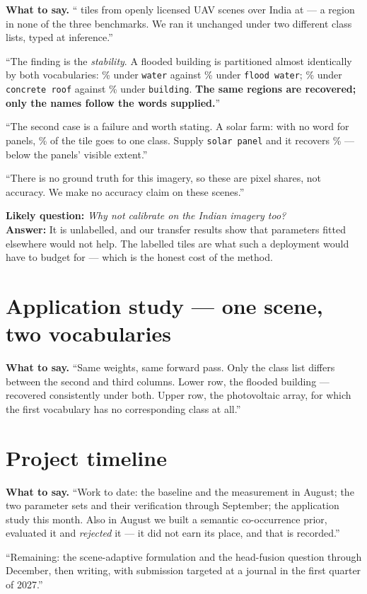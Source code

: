 \documentclass[11pt,a4paper]{article}
\newcommand{\best}[1]{\textcolor{acc}{\textbf{#1}}}
\newcommand{\bad}[1]{\textcolor{warn}{#1}}
\newcommand{\say}[1]{\par\smallskip\noindent\textbf{What to say.} #1}
\newcommand{\ask}[2]{\par\smallskip\noindent\textbf{Likely question:} \emph{#1}\\
  \textbf{Answer:} #2}
\begin{document}
\say{``\indTiles{} tiles from \indScenes{} openly licensed UAV scenes over India
at \indGSD{} --- a region in none of the three benchmarks. We ran it unchanged
under two different class lists, typed at inference.''

\smallskip
``The finding is the \emph{stability}. A flooded building is partitioned almost
identically by both vocabularies: \indFloodA{}\% under \texttt{water} against
\indFloodB{}\% under \texttt{flood water}; \indBldgA{}\% under
\texttt{concrete roof} against \indBldgB{}\% under \texttt{building}. \best{The
same regions are recovered; only the names follow the words supplied.}''

\smallskip
``The second case is a failure and worth stating. A solar farm: with no word for
panels, \indVegA{}\% of the tile goes to one class. Supply \texttt{solar panel}
and it recovers \indSolarB{}\% --- \bad{below the panels' visible extent}.''

\smallskip
``\bad{There is no ground truth for this imagery}, so these are pixel shares, not
accuracy. We make no accuracy claim on these scenes.''}

\ask{Why not calibrate on the Indian imagery too?}{It is unlabelled, and our
transfer results show that parameters fitted elsewhere would not help. The
\calibTiles{} labelled tiles are what such a deployment would have to budget for
--- which is the honest cost of the method.}

\section{Application study --- one scene, two vocabularies}
\say{``Same weights, same forward pass. Only the class list differs between the
second and third columns. Lower row, the flooded building --- recovered
consistently under both. Upper row, the photovoltaic array, for which the first
vocabulary has no corresponding class at all.''}

\section{Project timeline}
\say{``Work to date: the baseline and the measurement in August; the two
parameter sets and their verification through September; the application study
this month. Also in August we built a semantic co-occurrence prior, evaluated it
and \emph{rejected} it --- it did not earn its place, and that is recorded.''

\smallskip
``Remaining: the scene-adaptive formulation and the head-fusion question through
December, then writing, with submission targeted at a journal in the first
quarter of 2027.''}
\end{document}
